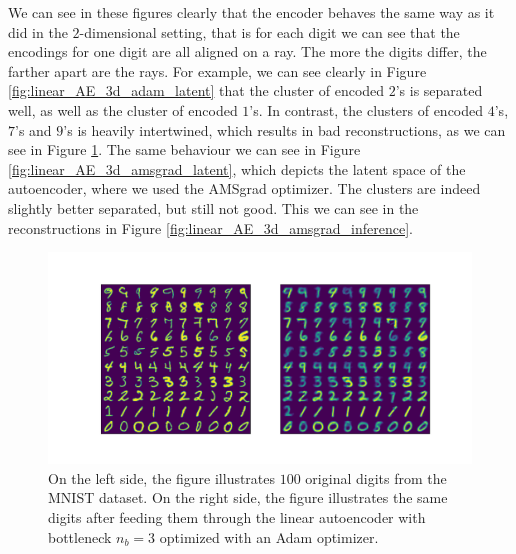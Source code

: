 We can see in these figures clearly that the encoder behaves the same way as it did in the $2$-dimensional setting, that is for each digit we can see that the encodings for one digit are all aligned on a ray. The more the digits differ, the farther apart are the rays. For example, we can see clearly in Figure \ref{fig:linear_AE_3d_adam_latent} that the cluster of encoded $2$'s is separated well, as well as the cluster of encoded $1$'s. In contrast, the clusters of encoded $4$'s, $7$'s and $9$'s is heavily intertwined, which results in bad reconstructions, as we can see in Figure \ref{fig:linear_AE_3d_adam_inference}. The same behaviour we can see in Figure \ref{fig:linear_AE_3d_amsgrad_latent}, which depicts the latent space of the autoencoder, where we used the AMSgrad optimizer. The clusters are indeed slightly better separated, but still not good. This we can see in the reconstructions in Figure \ref{fig:linear_AE_3d_amsgrad_inference}.

\begin{figure}
\begin{center}
   \begin{minipage}[b]{\linewidth}
      \includegraphics[trim = 15mm 10mm 15mm 15mm, clip, width=\linewidth]{linear_AE_3d_adam_inference}
	\end{minipage}
\end{center}
\caption{On the left side, the figure illustrates $100$ original digits from the MNIST dataset. On the right side, the figure illustrates the same digits after feeding them through the linear autoencoder with bottleneck $n_b=3$ optimized with an Adam optimizer.}\label{fig:linear_AE_3d_adam_inference}
\end{figure}


